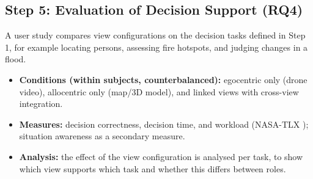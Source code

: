 \documentclass{article}
\begin{document}
\subsection{Step 5: Evaluation of Decision Support (RQ4)}
A user study compares view configurations on the decision tasks defined in Step 1, for example locating persons, assessing fire hotspots, and judging changes in a flood.
\begin{itemize}
  \item \textbf{Conditions (within subjects, counterbalanced):} egocentric only (drone video), allocentric only (map/3D model), and linked views with cross-view integration.
  \item \textbf{Measures:} decision correctness, decision time, and workload (NASA-TLX \cite{hart1988}); situation awareness \cite{endsley1995} as a secondary measure.
  \item \textbf{Analysis:} the effect of the view configuration is analysed per task, to show which view supports which task and whether this differs between roles.
\end{itemize}



\newpage


\end{document}
